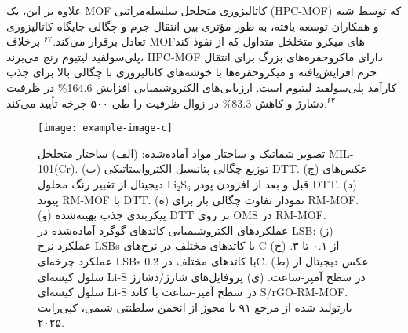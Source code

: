 \documentclass[12pt,a4paper,twocolumn]{article} %
\newcommand{\persian}[1]{\textfarsi{#1}}
\newcommand{\english}[1]{\textenglish{#1}}
\newcommand{\farsibold}[1]{{\farsifontbold{#1}}}
\begin{document}
\persian{
علاوه بر این، یک \english{MOF} کاتالیزوری متخلخل سلسله‌مراتبی (\english{HPC-MOF}) که توسط شیه و همکاران توسعه یافته، به طور مؤثری بین انتقال جرم و چگالی جایگاه کاتالیزوری تعادل برقرار می‌کند.$^{۶۲}$ برخلاف \english{MOF}های میکرو متخلخل متداول که از نفوذ کند پلی‌سولفید لیتیوم رنج می‌برند، \english{HPC-MOF} دارای ماکروحفره‌های بزرگ برای انتقال جرم افزایش‌یافته و میکروحفره‌ها با خوشه‌های کاتالیزوری با چگالی بالا برای جذب کارآمد پلی‌سولفید لیتیوم است. ارزیابی‌های الکتروشیمیایی افزایش \english{164.6\%} در ظرفیت دشارژ و کاهش \english{83.3\%} در زوال ظرفیت را طی ۵۰۰ چرخه تأیید می‌کند.$^{۶۲}$
}

\begin{figure*}[t]
    \centering
    \texttt{[image: example-image-c]} %
    \caption{\persian{
    \farsibold{شکل ۶.} تصویر شماتیک و ساختار مواد آماده‌شده: (الف) ساختار متخلخل \english{MIL-101(Cr)}. (ب) توزیع چگالی پتانسیل الکترواستاتیکی \english{DTT}. (ج) عکس‌های دیجیتال از تغییر رنگ محلول \english{Li₂S₆} قبل و بعد از افزودن پودر \english{DTT}. (د) پیوند \english{RM-MOF} با \english{DTT}. (ه) نمودار تفاوت چگالی بار برای \english{RM-MOF}. (و) پیکربندی جذب بهینه‌شده \english{DTT} بر روی \english{OMS} در \english{RM-MOF}. عملکردهای الکتروشیمیایی کاتدهای گوگرد آماده‌شده در \english{LSB}: (ز) عملکرد نرخ \english{LSBs} با کاتدهای مختلف در نرخ‌های \english{C} از ۰.۱ تا ۳. (ح) عملکرد چرخه‌ای \english{LSBs} با کاتدهای مختلف در \english{0.2C}. (ط) عکس دیجیتال از سلول کیسه‌ای \english{Li-S} در سطح آمپر-ساعت. (ی) پروفایل‌های شارژ/دشارژ سلول کیسه‌ای \english{Li-S} در سطح آمپر-ساعت با کاتد \english{S/rGO-RM-MOF}. بازتولید شده از مرجع ۹۱ با مجوز از انجمن سلطنتی شیمی، کپی‌رایت ۲۰۲۵.
    }}
    \label{fig:6}
\end{figure*}

\end{document}
